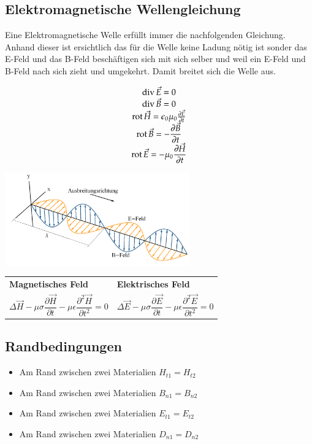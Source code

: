 \subsection{Elektromagnetische Wellengleichung}
Eine Elektromagnetische Welle erfüllt immer die nachfolgenden Gleichung. Anhand dieser ist ersichtlich das für die Welle keine Ladung nötig ist sonder das E-Feld und das B-Feld beschäftigen sich mit sich selber und weil ein E-Feld und B-Feld nach sich zieht und umgekehrt. Damit breitet sich die Welle aus. \\
\begin{minipage}{8cm}
	\[\begin{matrix}
	\operatorname{div} \vec{E}=0\\
	\operatorname{div} \vec{B}=0\\
	\operatorname{rot} \vec{H}=\epsilon_{0}\mu_{0} \frac{\partial \vec{E}}{\partial t}\\
	\operatorname{rot} \vec{B}=-\dfrac{\partial \vec{B}}{\partial t}\\
	\operatorname{rot} \vec{E}=-\mu_{0}\dfrac{\partial \vec{H}}{\partial t}
	\end{matrix}\]
\end{minipage}
\begin{minipage}{8cm}
	\includegraphics[width=8cm]{images/EMWelle.jpg}
\end{minipage}

\begin{tabular}{p{} p{}}
	{\hspace{-2.5cm}\centering\textbf{Magnetisches Feld}\par}&{\hspace{-2.5cm}\centering\textbf{Elektrisches Feld}\par}\\[-1.5cm]
	\[\Delta\vec{H}-\mu\sigma\frac{\partial \vec{H}}{\partial t}-\mu\epsilon\frac{\partial^{2}\vec{H}}{\partial t^{2}}=0\]&	\[\Delta\vec{E}-\mu\sigma\frac{\partial \vec{E}}{\partial t}-\mu\epsilon\frac{\partial^{2}\vec{E}}{\partial t^{2}}=0\]  \\
\end{tabular}
\subsection{Randbedingungen}
\begin{itemize}
	\item Am Rand zwischen zwei Materialien $H_{t1}=H_{t2}$
	\item Am Rand zwischen zwei Materialien $B_{n1}=B_{n2}$
	\item Am Rand zwischen zwei Materialien $E_{t1}=E_{t2}$
	\item Am Rand zwischen zwei Materialien $D_{n1}=D_{n2}$
\end{itemize}
